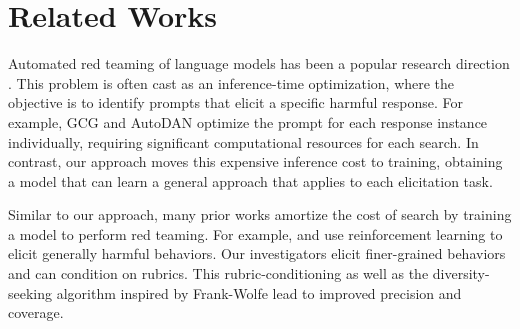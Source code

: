 \section{Related Works}
Automated red teaming of language models has been a popular research direction \cite{perez2022redteaming,zou2024gcg,liu2023autodan}. This problem is often cast as an inference-time optimization, where the objective is to identify prompts that elicit a specific harmful response. For example, GCG \cite{zou2024gcg} and AutoDAN \cite{liu2023autodan} optimize the prompt for each response instance individually, requiring significant computational resources for each search. In contrast, our approach moves this expensive inference cost to training, obtaining a model that can learn a general approach that applies to each elicitation task.

Similar to our approach, many prior works amortize the cost of search by training a model to perform red teaming. For example, \citet{perez2022redteaming} and \citet{hong2024curiosity} use reinforcement learning to elicit generally harmful behaviors. Our investigators elicit finer-grained behaviors and can condition on rubrics. This rubric-conditioning as well as the diversity-seeking algorithm inspired by Frank-Wolfe lead to improved precision and coverage.